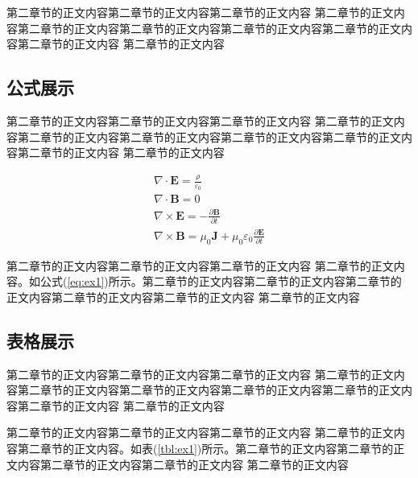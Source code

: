 \documentclass{yacaugrad}
\begin{document}
第二章节的正文内容第二章节的正文内容第二章节的正文内容
第二章节的正文内容第二章节的正文内容第二章节的正文内容第二章节的正文内容第二章节的正文内容第二章节的正文内容
第二章节的正文内容

\subsection{公式展示}

第二章节的正文内容第二章节的正文内容第二章节的正文内容
第二章节的正文内容第二章节的正文内容第二章节的正文内容第二章节的正文内容第二章节的正文内容第二章节的正文内容
第二章节的正文内容

\begin{equation} \label{eq:ex1}
  \begin{array}{l}
    \nabla \cdot \mathbf{E} = \frac{\rho}{\varepsilon _0}  \\
    \nabla \cdot \mathbf{B} = 0 \\
    \nabla \times  \mathbf{E} = -\frac{\partial \mathbf{B}}{\partial t }  \\
    \nabla \times  \mathbf{B} = \mu _0\mathbf{J} + \mu _0\varepsilon_0 \frac{\partial \mathbf{E}}{\partial t }
  \end{array}
\end{equation}

第二章节的正文内容第二章节的正文内容第二章节的正文内容
第二章节的正文内容。如公式(\ref{eq:ex1})所示。第二章节的正文内容第二章节的正文内容第二章节的正文内容第二章节的正文内容第二章节的正文内容
第二章节的正文内容

\subsection{表格展示}

第二章节的正文内容第二章节的正文内容第二章节的正文内容
第二章节的正文内容第二章节的正文内容第二章节的正文内容第二章节的正文内容第二章节的正文内容第二章节的正文内容
第二章节的正文内容


第二章节的正文内容第二章节的正文内容第二章节的正文内容
第二章节的正文内容第二章节的正文内容。如表(\ref{tbl:ex1})所示。第二章节的正文内容第二章节的正文内容第二章节的正文内容第二章节的正文内容
第二章节的正文内容
\end{document}
